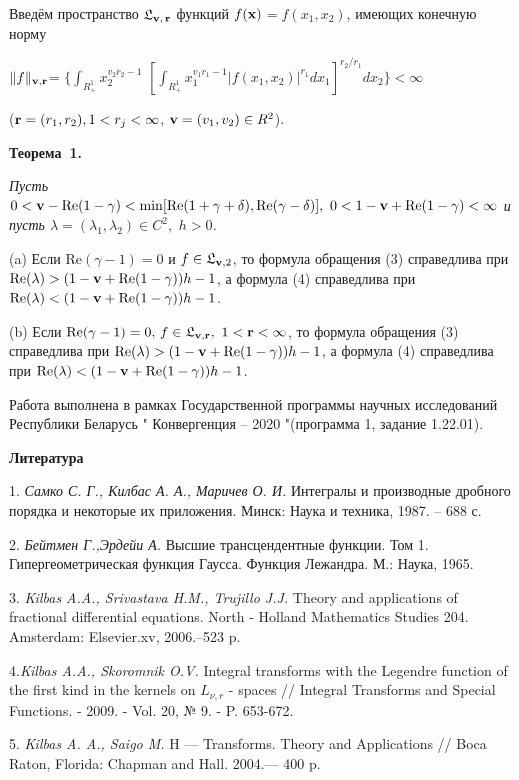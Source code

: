 Введём пространство  $\mathfrak{L}_{{\bf v},\,{\bf r}}$ функций
$f({\bf{x}})$$=f(x_{1},x_{2})$, имеющих конечную норму

\noindent$ \|f\|_{\bf{v},\bf{r}}$=
 $ \{\int_{R_{+}^{1}}x_{2}^{v_{2}r_{2}-1}$
$[\int_{R_{+}^{1}}x_{1}^{v_{1}r_{1}-1}
|f(x_{1},x_{2})|^{r_{1}}dx_{1}]^{r_{2}/r_{1}}dx_{2}\} <\infty$

 \noindent(${\bf r}=(r_{1},r_{2}), 1<{ r_{j}}<\infty$,
 ${\bf v}=(v_{1},v_{2})\in { R}^{2}$).


 \textbf{Теорема~1.} {\it Пусть
$0<{\bf
v}-\mathrm{Re}(1-\gamma)<\min[\mathrm{Re}(1+\gamma+\delta),\mathrm{Re}(\gamma-\delta)],\,\,
0<1-{\bf v}+\mathrm{Re}(1-\gamma)<\infty$ и пусть $\lambda =
(\lambda_{1},\lambda_{2})\in C^{2},\,\,h>0$.

(a) Если $\mathrm{Re}(\gamma-1)=0$ и $f\in\mathfrak{L}_{{\bf v},2}$,
то формула обращения (3)  справедлива  при
$\mathrm{Re}(\lambda)>(1-{\bf v}+\mathrm{Re}(1-\gamma))h-1$, а
формула (4) справедлива при $\mathrm{Re}(\lambda)<(1-{\bf
v}+\mathrm{Re}(1-\gamma))h-1$.

(b) Если $\mathrm{Re}(\gamma-1)=0,\,f\in\mathfrak{L}_{{\bf v},{\bf
r}},\,\,1<{\bf r}<\infty$, то формула обращения  (3) справедлива при
$\mathrm{Re}(\lambda)>(1-{\bf v}+\mathrm{Re}(1-\gamma))h-1$, а
формула (4) справедлива при $\mathrm{Re}(\lambda)<(1-{\bf
v}+\mathrm{Re}(1-\gamma))h-1$.}

Работа выполнена в рамках Государственной программы научных
исследований Республики Беларусь " Конвергенция -- 2020 "(программа
1, задание 1.22.01).

\smallskip \centerline{\bf Литература}\nopagebreak


1. {\it Самко С. Г., Килбас А. А., Маричев О. И.} Интегралы и
производные дробного порядка и некоторые их приложения. Минск: Наука
и техника, 1987. -- 688 с.

2. {\it  Бейтмен Г.,Эрдейи А.}  Высшие трансцендентные функции. Том
1. Гипергеометрическая функция Гаусса. Функция Лежандра. М.: Наука,
1965.

3. {\it Kilbas A.A., Srivastava H.M., Trujillo J.J.} Theory and
applications of fractional differential equations. North - Holland
Mathematics Studies 204. Amsterdam: Elsevier.xv, 2006.--523 p.

4.{\it Kilbas A.A., Skoromnik O.V.} Integral transforms with the
Legendre function of the first kind in the kernels on $L_{\nu,r}$ -
spaces // Integral Transforms and Special Functions. - 2009. - Vol.
20, № 9. - P. 653-672.

5. {\it  Kilbas A. A., Saigo M.} H — Transforms. Theory and
Applications // Boca Raton, Florida: Chapman and Hall. 2004.— 400 p.



